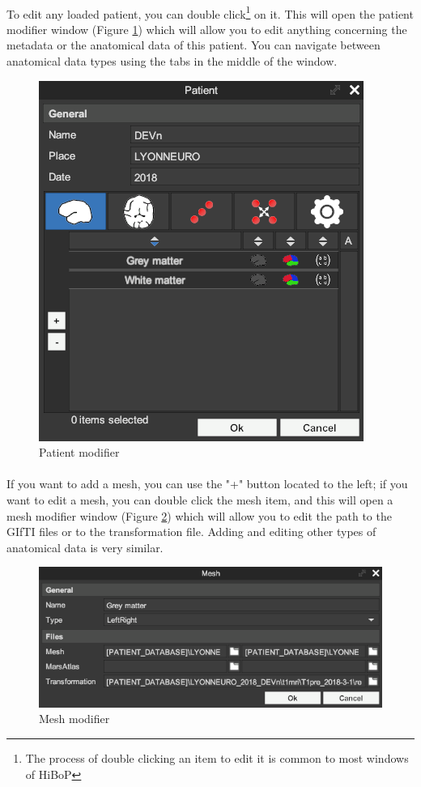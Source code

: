 \documentclass[a4paper]{article}
\begin{document}
\paragraph{} To edit any loaded patient, you can double click\footnote{The process of double clicking an item to edit it is common to most windows of HiBoP} on it. This will open the patient modifier window (Figure \ref{patientModifierUI}) which will allow you to edit anything concerning the metadata or the anatomical data of this patient. You can navigate between anatomical data types using the tabs in the middle of the window.
\begin{figure}[H]
\begin{center}
\includegraphics[scale=0.5]{PatientModifier.png}
\end{center}
\caption{\label{patientModifierUI}Patient modifier}
\end{figure}
\paragraph{} If you want to add a mesh, you can use the "+" button located to the left; if you want to edit a mesh, you can double click the mesh item, and this will open a mesh modifier window (Figure \ref{meshModifierUI}) which will allow you to edit the path to the GIfTI files or to the transformation file. Adding and editing other types of anatomical data is very similar.
\begin{figure}[H]
\begin{center}
\includegraphics[scale=0.5]{MeshModifier.png}
\end{center}
\caption{\label{meshModifierUI}Mesh modifier}
\end{figure}
\end{document}
